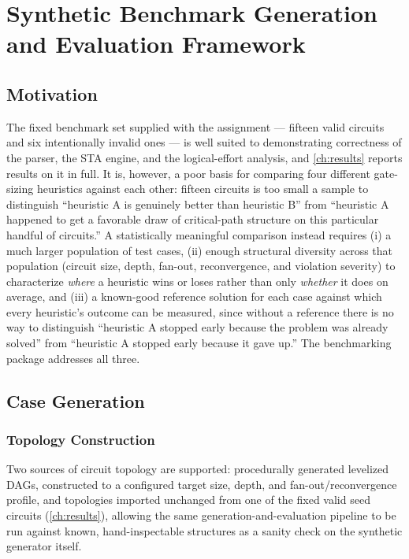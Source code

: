 \chapter{Synthetic Benchmark Generation and Evaluation Framework}
\label{ch:benchmarking}

\section{Motivation}
\label{sec:bench-motivation}

The fixed benchmark set supplied with the assignment --- fifteen valid
circuits and six intentionally invalid ones --- is well suited to
demonstrating correctness of the parser, the STA engine, and the
logical-effort analysis, and \cref{ch:results} reports results on it in
full. It is, however, a poor basis for comparing four different gate-sizing
heuristics against each other: fifteen circuits is too small a sample to
distinguish ``heuristic A is genuinely better than heuristic B'' from
``heuristic A happened to get a favorable draw of critical-path structure
on this particular handful of circuits.'' A statistically meaningful
comparison instead requires (i) a much larger population of test cases,
(ii) enough structural diversity across that population (circuit size,
depth, fan-out, reconvergence, and violation severity) to characterize
\emph{where} a heuristic wins or loses rather than only \emph{whether} it
does on average, and (iii) a known-good reference solution for each case
against which every heuristic's outcome can be measured, since without a
reference there is no way to distinguish ``heuristic A stopped early
because the problem was already solved'' from ``heuristic A stopped early
because it gave up.'' The benchmarking package addresses all three.

\section{Case Generation}
\label{sec:bench-generation}

\subsection{Topology Construction}

Two sources of circuit topology are supported: procedurally generated
levelized DAGs, constructed to a configured target size, depth, and
fan-out/reconvergence profile, and topologies imported unchanged from one of
the fixed valid seed circuits (\cref{ch:results}), allowing the same
generation-and-evaluation pipeline to be run against known, hand-inspectable
structures as a sanity check on the synthetic generator itself.

